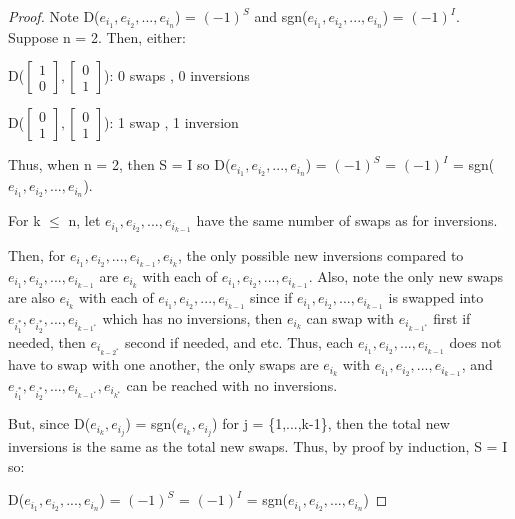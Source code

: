     \begin{proof}
        Note D($e_{i_1},e_{i_2},...,e_{i_n}$) = $(-1)^S$
        and sgn($e_{i_1},e_{i_2},...,e_{i_n}$) = $(-1)^I$.
        Suppose n = 2. Then, either:

        \hspace{0.5cm}
        D($\begin{bmatrix}
                1 \\
                0
            \end{bmatrix},
            \begin{bmatrix}
                0 \\
                1
            \end{bmatrix}$):
        \hspace{1cm}
        0 swaps , 0 inversions

        \hspace{0.5cm}
        D($\begin{bmatrix}
                0 \\
                1
            \end{bmatrix},
            \begin{bmatrix}
                0 \\
                1
            \end{bmatrix}$):
        \hspace{1cm}
        1 swap , 1 inversion

        Thus, when n = 2, then S = I so
        D($e_{i_1},e_{i_2},...,e_{i_n}$) = $(-1)^S$
        = $(-1)^I$ = sgn($e_{i_1},e_{i_2},...,e_{i_n}$).

        For k $\leq$ n, let $e_{i_1},e_{i_2},...,e_{i_{k-1}}$
        have the same number of swaps as for inversions.

        Then, for $e_{i_1},e_{i_2},...,e_{i_{k-1}},e_{i_k}$,
        the only possible new inversions compared to
        $e_{i_1},e_{i_2},...,e_{i_{k-1}}$ are $e_{i_k}$
        with each of $e_{i_1},e_{i_2},...,e_{i_{k-1}}$.
        Also, note the only new swaps are also $e_{i_k}$
        with each of $e_{i_1},e_{i_2},...,e_{i_{k-1}}$
        since if $e_{i_1},e_{i_2},...,e_{i_{k-1}}$ is swapped into
        $e_{i_1^*},e_{i_2^*},...,e_{i_{k-1^*}}$ which has no inversions,
        then $e_{i_k}$ can swap with $e_{i_{k-1^*}}$ first if needed,
        then $e_{i_{k-2^*}}$ second if needed, and etc. Thus, each
        $e_{i_1},e_{i_2},...,e_{i_{k-1}}$ does not have to swap with one another,
        the only swaps are $e_{i_k}$ with $e_{i_1},e_{i_2},...,e_{i_{k-1}}$,
        and $e_{i_1^*},e_{i_2^*},...,e_{i_{k-1^*}},e_{i_{k^*}}$
        can be reached with no inversions.

        But, since D($e_{i_k},e_{i_j}$) = sgn($e_{i_k},e_{i_j}$)
        for j = \{1,...,k-1\}, then the total new inversions
        is the same as the total new swaps.
        Thus, by proof by induction, S = I so:
        
        \hspace{0.5cm}
        D($e_{i_1},e_{i_2},...,e_{i_n}$)
        = $(-1)^S$
        = $(-1)^I$
        = sgn($e_{i_1},e_{i_2},...,e_{i_n}$)
    \end{proof}

